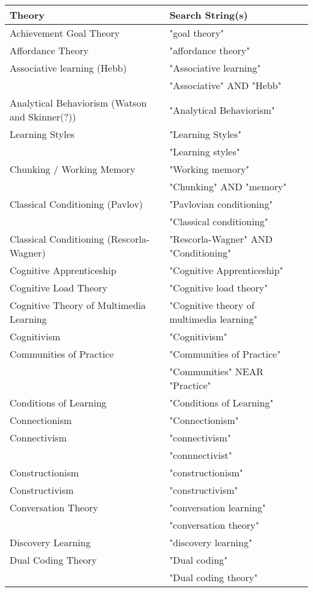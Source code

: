 \begin{table*}[t]
\begin{tabular}{ll}
Theory & Search String(s)\\\hline
Achievement Goal Theory & "goal theory"\\
Affordance Theory & "affordance theory"\\
Associative learning (Hebb) & "Associative learning"\\
 & "Associative" AND "Hebb"\\
Analytical Behaviorism (Watson and Skinner(?)) & "Analytical Behaviorism"\\
Learning Styles & "Learning Styles"\\
 & "Learning styles"\\
Chunking / Working Memory & "Working memory"\\
 & "Chunking" AND "memory"\\
Classical Conditioning (Pavlov) & "Pavlovian conditioning"\\
 & "Classical conditioning"\\
Classical Conditioning (Rescorla-Wagner) & "Rescorla-Wagner" AND "Conditioning"\\
Cognitive Apprenticeship & "Cognitive Apprenticeship"\\
Cognitive Load Theory & "Cognitive load theory"\\
Cognitive Theory of Multimedia Learning & "Cognitive theory of multimedia learning"\\
Cognitivism & "Cognitivism"\\
Communities of Practice & "Communities of Practice"\\
 & "Communities" NEAR "Practice"\\
Conditions of Learning & "Conditions of Learning"\\
Connectionism & "Connectionism"\\
Connectivism & "connectivism"\\
 & "connnectivist"\\
Constructionism & "constructionism"\\
Constructivism & "constructivism"\\
Conversation Theory & "conversation learning"\\
 & "conversation theory"\\
Discovery Learning & "discovery learning"\\
Dual Coding Theory & "Dual coding"\\
 & "Dual coding theory"\\

\end{tabular}
\end{table*}
